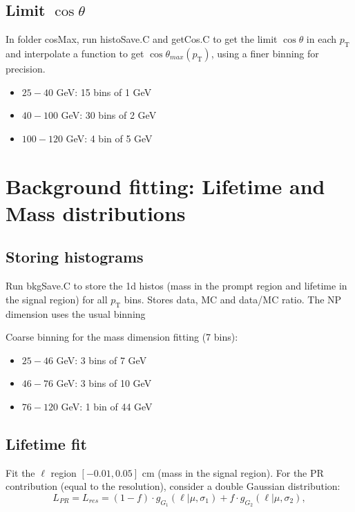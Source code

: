 \documentclass{article}
\newcommand{\pt}{p_\text{T}}
\newcommand{\cost}{\cos\theta}
\begin{document}
\subsection{Limit $\cost$}

In folder cosMax, run histoSave.C and getCos.C to get the limit $\cost$ in each $\pt$ and interpolate a function to get $\cost_{max}(\pt)$, using a finer binning for precision.
\begin{itemize}
\item $25-40$ GeV: 15 bins of 1 GeV
\item $40-100$ GeV: 30 bins of 2 GeV
\item $100-120$ GeV: 4 bin of 5 GeV
\end{itemize}

\pagebreak

\section{Background fitting: Lifetime and Mass distributions}

\subsection{Storing histograms}

Run bkgSave.C to store the 1d histos (mass in the prompt region and lifetime in the signal region) for all $\pt$ bins. Stores data, MC and data/MC ratio. The NP dimension uses the usual binning

Coarse binning for the mass dimension fitting (7 bins):
\begin{itemize}
\item $25-46$ GeV: 3 bins of 7 GeV
\item $46-76$ GeV: 3 bins of 10 GeV
\item $76-120$ GeV: 1 bin of 44 GeV
\end{itemize}

\subsection{Lifetime fit}

Fit the $\ell$ region $[-0.01,0.05]$ cm (mass in the signal region). For the PR contribution (equal to the resolution), consider a double Gaussian distribution:
\begin{equation}
L_{PR}=L_{res} = (1-f)\cdot g_{G_1}(\ell|\mu, \sigma_1)+f\cdot g_{G_2}(\ell|\mu, \sigma_2),
\end{equation}
\end{document}
